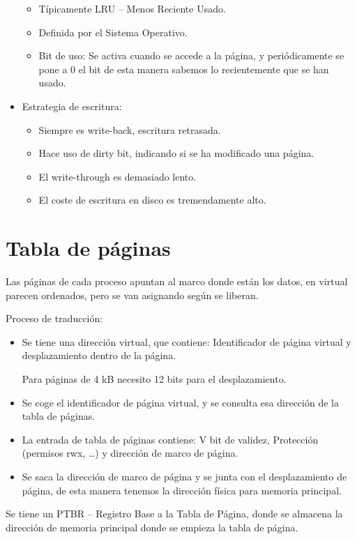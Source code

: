 \documentclass[12pt, twoside, openright]{report} %
\begin{document}
\begin{itemize}
    \begin{itemize}
    
    \item
      Típicamente LRU -- Menos Reciente Usado.
    \item
      Definida por el Sistema Operativo.
    \item
      Bit de uso: Se activa cuando se accede a la página, y
      periódicamente se pone a 0 el bit de esta manera sabemos lo
      recientemente que se han usado.
    \end{itemize}
  \item
    Estrategia de escritura:

    \begin{itemize}
    
    \item
      Siempre es write-back, escritura retrasada.
    \item
      Hace uso de dirty bit, indicando si se ha modificado una página.
    \item
      El write-through es demasiado lento.
    \item
      El coste de escritura en disco es tremendamente alto.
    \end{itemize}
  \end{itemize}

  \section{Tabla de páginas}

  Las páginas de cada proceso apuntan al marco donde están los datos, en
  virtual parecen ordenados, pero se van asignando según se liberan.

    Proceso de traducción:
    \begin{itemize}

  \item Se tiene una dirección virtual, que contiene: Identificador de
    página virtual y desplazamiento dentro de la página.

    Para páginas de 4 kB necesito 12 bits para el desplazamiento.

    
    
    \item
      Se coge el identificador de página virtual, y se consulta esa
      dirección de la tabla de páginas.
    \item
      La entrada de tabla de páginas contiene: V bit de validez,
      Protección (permisos rwx, \ldots) y dirección de marco de página.
  \item
    Se saca la dirección de marco de página y se junta con el
    desplazamiento de página, de esta manera tenemos la dirección física
    para memoria principal.
    \begin{figure}[H]
      {\def\svgwidth{.9\textwidth}
       }
    \end{figure}
  \end{itemize}
  Se tiene un PTBR -- Registro Base a la Tabla de Página, donde se
  almacena la dirección de memoria principal donde se empieza la tabla
  de página.
\end{document}
